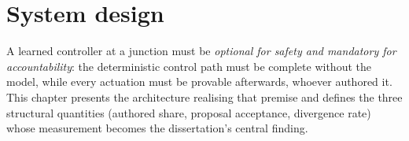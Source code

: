 \chapter{System design}\label{ch:design}

A learned controller at a junction must be \emph{optional for safety and
mandatory for accountability}: the deterministic control path must be
complete without the model, while every actuation must be provable
afterwards, whoever authored it. This
chapter presents the architecture realising that premise and defines the
three structural quantities (authored share, proposal acceptance,
divergence rate) whose measurement becomes the dissertation's central
finding.








